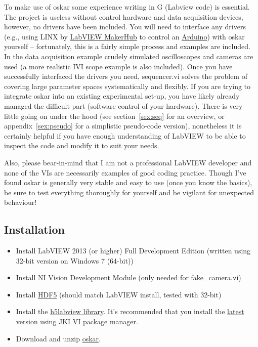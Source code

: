 \documentclass[10pt,a4paper]{article}
\begin{document}
To make use of oskar some experience writing in G (Labview code) is essential. The project is useless without control hardware and data acquisition devices, however, no drivers have been included. You will need to interface any drivers (e.g., using  LINX by \href{https://www.labviewmakerhub.com}{LabVIEW MakerHub} to control an  \href{https://www.arduino.cc/}{Arduino}) with oskar yourself -- fortunately, this is a fairly simple process and examples are included.  In the data acquisition example crudely simulated oscilloscopes and cameras are used (a more realistic IVI scope example is also included).  Once you have successfully  interfaced the drivers you need, sequencer.vi solves the problem of covering large parameter spaces systematically and flexibly.  If you are trying to integrate oskar into an existing experimental set-up, you have likely already managed the difficult part (software control of your hardware).  There is very little going on under the hood (see section~\ref{sex:seq} for an overview, or appendix~\ref{sex:pseudo} for a simplistic pseudo-code version),  nonetheless it is certainly helpful if you have enough understanding of LabVIEW to be able to inspect the code and modify it to suit your needs.

Also, please bear-in-mind that I am not a professional LabVIEW developer and none of the VIs are necessarily examples of good coding practice. Though I've found oskar is generally very stable and easy to use (once you know the basics), be sure to test everything thoroughly for yourself and be vigilant for unexpected behaviour!
\subsection*{Installation}

\begin{itemize}
\item Install LabVIEW 2013 (or higher) Full Development Edition (written using 32-bit version
 on Windows 7 (64-bit))

\item Install NI Vision Development Module (only needed for fake\_camera.vi)

\item  Install \href{https://www.hdfgroup.org/HDF5/release/obtain5.html}{HDF5} (should match LabVIEW install, tested with 32-bit)

\item Install the \href{http://h5labview.sourceforge.net/}{h5labview library}.  It's recommended that you install the \href{https://sourceforge.net/projects/h5labview/files/}{latest version} using \href{http://vipm.jki.net/}{JKI VI package manager}. 

\item Download and unzip \href{https://github.com/PositroniumSpectroscopy/oskar}{oskar}.

\end{itemize}
\end{document}
